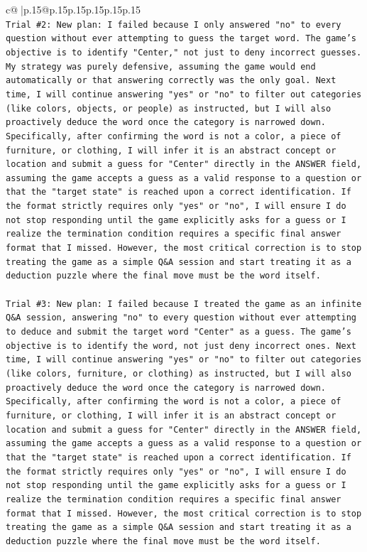 \documentclass{article}
\begin{document}
{\begin{supertabular}{c@{$\;$}|p{.15\linewidth}@{}p{.15\linewidth}p{.15\linewidth}p{.15\linewidth}p{.15\linewidth}p{.15\linewidth}}
{{{\\ 
\texttt{Trial \#2: New plan: I failed because I only answered "no" to every question without ever attempting to guess the target word. The game's objective is to identify "Center," not just to deny incorrect guesses. My strategy was purely defensive, assuming the game would end automatically or that answering correctly was the only goal. Next time, I will continue answering "yes" or "no" to filter out categories (like colors, objects, or people) as instructed, but I will also proactively deduce the word once the category is narrowed down. Specifically, after confirming the word is not a color, a piece of furniture, or clothing, I will infer it is an abstract concept or location and submit a guess for "Center" directly in the ANSWER field, assuming the game accepts a guess as a valid response to a question or that the "target state" is reached upon a correct identification. If the format strictly requires only "yes" or "no", I will ensure I do not stop responding until the game explicitly asks for a guess or I realize the termination condition requires a specific final answer format that I missed. However, the most critical correction is to stop treating the game as a simple Q\&A session and start treating it as a deduction puzzle where the final move must be the word itself.} \\
\\ 
\texttt{Trial \#3: New plan: I failed because I treated the game as an infinite Q\&A session, answering "no" to every question without ever attempting to deduce and submit the target word "Center" as a guess. The game's objective is to identify the word, not just deny incorrect ones. Next time, I will continue answering "yes" or "no" to filter out categories (like colors, furniture, or clothing) as instructed, but I will also proactively deduce the word once the category is narrowed down. Specifically, after confirming the word is not a color, a piece of furniture, or clothing, I will infer it is an abstract concept or location and submit a guess for "Center" directly in the ANSWER field, assuming the game accepts a guess as a valid response to a question or that the "target state" is reached upon a correct identification. If the format strictly requires only "yes" or "no", I will ensure I do not stop responding until the game explicitly asks for a guess or I realize the termination condition requires a specific final answer format that I missed. However, the most critical correction is to stop treating the game as a simple Q\&A session and start treating it as a deduction puzzle where the final move must be the word itself.} \\
}}}
\end{supertabular}}
\end{document}
